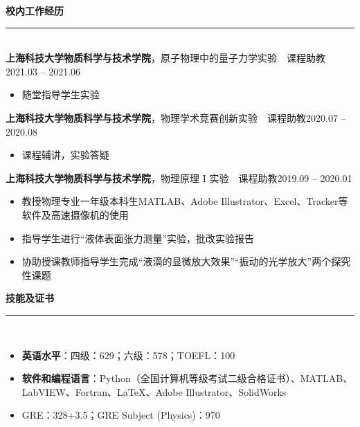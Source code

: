 \documentclass[letterpaper,11pt]{article}
\begin{document}
{\Large\bfseries{}校内工作经历}\\
\rule[1.5ex]{\columnwidth}{1pt}\\
{\songti\large\bfseries{}上海科技大学物质科学与技术学院}，{\large{}原子物理中的量子力学实验~~课程助教}\hfill{2021.03 -- 2021.06}\\
\vspace{-4ex}
\begin{itemize}
    \item 随堂指导学生实验
\end{itemize}
{\songti\large\bfseries{}上海科技大学物质科学与技术学院}，{\large{}物理学术竞赛创新实验~~课程助教}\hfill{2020.07 -- 2020.08}\\
\vspace{-4ex}
\begin{itemize}
    \item 课程辅讲，实验答疑
\end{itemize}
{\songti\large\bfseries{}上海科技大学物质科学与技术学院}，{\large{}物理原理 I 实验~~课程助教}\hfill{2019.09 -- 2020.01}\\
\vspace{-4ex}
\begin{itemize}
    \item 教授物理专业一年级本科生MATLAB、Adobe Illustrator、Excel、Tracker等软件及高速摄像机的使用
    \item 指导学生进行“液体表面张力测量”实验，批改实验报告
    \item 协助授课教师指导学生完成“液滴的显微放大效果”“振动的光学放大”两个探究性课题
\end{itemize}
\vspace{1ex}

{\Large\bfseries{}技能及证书}\\
\rule[1.5ex]{\columnwidth}{1pt}\\
\vspace{-4ex}
\begin{itemize}
    \item \textbf{\songti\bfseries{}英语水平}：四级：629；六级：578；TOEFL：100
    \item {\songti\bfseries{}软件和编程语言}：Python（全国计算机等级考试二级合格证书）、MATLAB、LabVIEW、Fortran、\LaTeX、Adobe Illustrator、SolidWorks
    \item GRE：328+3.5；GRE Subject (Physics)：970
\end{itemize}
\end{document}

